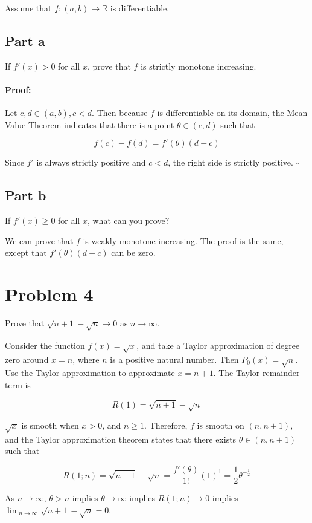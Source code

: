 \documentclass{article}
\newenvironment{proof}{\paragraph{Proof:}}{\hfill$\square$}
\newcommand{\R}{\mathbb{R}}
\begin{document}
Assume that $f:(a, b) \rightarrow \R$ is differentiable.

\subsection*{Part a}

If $f'(x) > 0$ for all $x$, prove that $f$ is strictly monotone increasing.

\begin{proof}
Let $c, d \in (a, b), c < d$. Then because $f$ is differentiable on its domain, the Mean Value Theorem indicates that there is a point $\theta \in (c, d)$ such that

\[
f(c)-f(d) = f'(\theta)(d-c)
\]

Since $f'$ is always strictly positive and $c < d$, the right side is strictly positive.
\end{proof}

\subsection*{Part b}

If $f'(x) \geq 0$ for all $x$, what can you prove?

We can prove that $f$ is weakly monotone increasing. The proof is the same, except that $f'(\theta)(d-c)$ 
can be zero.

\section*{Problem 4}
Prove that $\sqrt{n+1} - \sqrt{n} \rightarrow 0$ as $n \rightarrow \infty$.

Consider the function $f(x) = \sqrt{x}$, and take a Taylor approximation of degree zero around $x = n$, where $n$ is a positive natural number. Then $P_0(x) = \sqrt{n}$. Use the Taylor approximation to approximate $x = n+1$. The Taylor remainder term is

\[
R(1) = \sqrt{n+1} - \sqrt{n}
\]

$\sqrt{x}$ is smooth when $x > 0$, and $n \geq 1$. Therefore, $f$ is smooth on $(n, n+1)$, and the Taylor approximation theorem states that there exists $\theta \in (n, n+1)$ such that

\[
R(1; n) = \sqrt{n+1} - \sqrt{n} = \frac{f'(\theta)}{1!}(1)^1 = \frac{1}{2}\theta^{-\frac{1}{2}}
\]

As $n \rightarrow \infty$, $\theta > n$ implies $\theta \rightarrow \infty$ implies $R(1; n) \rightarrow 0$ implies $\lim_{n \rightarrow \infty} \sqrt{n+1} - \sqrt{n} = 0$.
\end{document}
